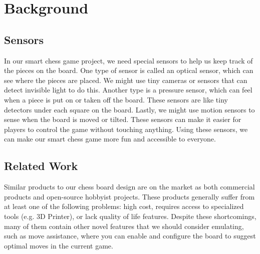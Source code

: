 \documentclass[11pt,journal]{IEEEtran}
\begin{document}


\section{Background}

\subsection{Sensors}
In our smart chess game project, we need special sensors to help us keep track of the pieces on the board. One type of sensor is called an optical sensor, which can see where the pieces are placed. We might use tiny cameras or sensors that can detect invisible light to do this. Another type is a pressure sensor, which can feel when a piece is put on or taken off the board. These sensors are like tiny detectors under each square on the board. Lastly, we might use motion sensors to sense when the board is moved or tilted. These sensors can make it easier for players to control the game without touching anything. Using these sensors, we can make our smart chess game more fun and accessible to everyone.

\subsection{Related Work}

Similar products to our chess board design are on the market as both commercial products and open-source hobbyist projects. These products generally suffer from at least one of the following problems: high cost, requires access to specialized tools (e.g. 3D Printer), or lack quality of life features. Despite these shortcomings, many of them contain other novel features that we should consider emulating, such as move assistance, where you can enable and configure the board to suggest optimal moves in the current game.



\end{document}
